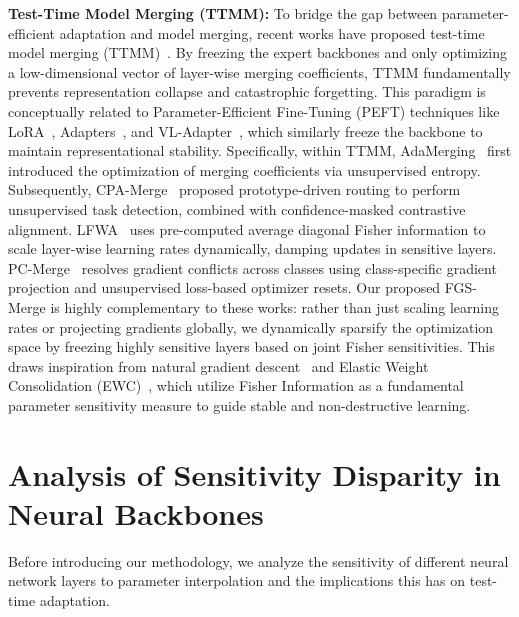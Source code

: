 \documentclass{article}
\theoremstyle{plain}
\theoremstyle{definition}
\theoremstyle{remark}
\begin{document}
\textbf{Test-Time Model Merging (TTMM):} To bridge the gap between parameter-efficient adaptation and model merging, recent works have proposed test-time model merging (TTMM)~\cite{yang2024adamerging, cpa_merge_anon2026, lfwa_anon2026, pc_merge_anon2026}. By freezing the expert backbones and only optimizing a low-dimensional vector of layer-wise merging coefficients, TTMM fundamentally prevents representation collapse and catastrophic forgetting. This paradigm is conceptually related to Parameter-Efficient Fine-Tuning (PEFT) techniques like LoRA~\cite{hu2021lora}, Adapters~\cite{houlsby2019parameter}, and VL-Adapter~\cite{sung2022vl}, which similarly freeze the backbone to maintain representational stability. Specifically, within TTMM, AdaMerging~\cite{yang2024adamerging} first introduced the optimization of merging coefficients via unsupervised entropy. Subsequently, CPA-Merge~\cite{cpa_merge_anon2026} proposed prototype-driven routing to perform unsupervised task detection, combined with confidence-masked contrastive alignment. LFWA~\cite{lfwa_anon2026} uses pre-computed average diagonal Fisher information to scale layer-wise learning rates dynamically, damping updates in sensitive layers. PC-Merge~\cite{pc_merge_anon2026} resolves gradient conflicts across classes using class-specific gradient projection and unsupervised loss-based optimizer resets. Our proposed FGS-Merge is highly complementary to these works: rather than just scaling learning rates or projecting gradients globally, we dynamically sparsify the optimization space by freezing highly sensitive layers based on joint Fisher sensitivities. This draws inspiration from natural gradient descent~\cite{amari1998natural} and Elastic Weight Consolidation (EWC)~\cite{kirkpatrick2017overcoming}, which utilize Fisher Information as a fundamental parameter sensitivity measure to guide stable and non-destructive learning.

\section{Analysis of Sensitivity Disparity in Neural Backbones}
\label{submission:disparity}

Before introducing our methodology, we analyze the sensitivity of different neural network layers to parameter interpolation and the implications this has on test-time adaptation. 
\end{document}
